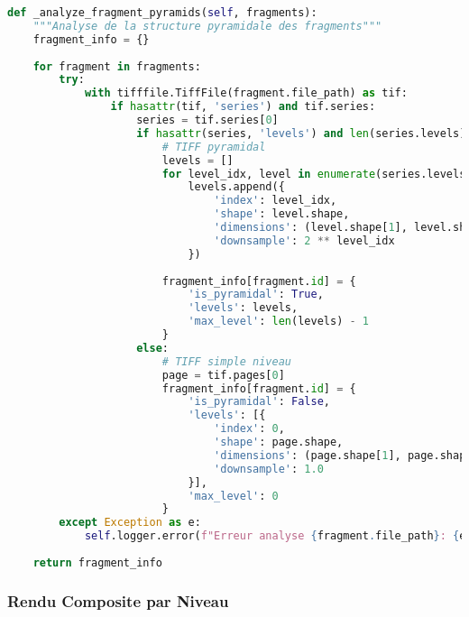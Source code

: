 \documentclass[12pt,a4paper]{article}
\begin{document}
\begin{lstlisting}[language=Python]
def _analyze_fragment_pyramids(self, fragments):
    """Analyse de la structure pyramidale des fragments"""
    fragment_info = {}
    
    for fragment in fragments:
        try:
            with tifffile.TiffFile(fragment.file_path) as tif:
                if hasattr(tif, 'series') and tif.series:
                    series = tif.series[0]
                    if hasattr(series, 'levels') and len(series.levels) > 1:
                        # TIFF pyramidal
                        levels = []
                        for level_idx, level in enumerate(series.levels):
                            levels.append({
                                'index': level_idx,
                                'shape': level.shape,
                                'dimensions': (level.shape[1], level.shape[0]),
                                'downsample': 2 ** level_idx
                            })
                        
                        fragment_info[fragment.id] = {
                            'is_pyramidal': True,
                            'levels': levels,
                            'max_level': len(levels) - 1
                        }
                    else:
                        # TIFF simple niveau
                        page = tif.pages[0]
                        fragment_info[fragment.id] = {
                            'is_pyramidal': False,
                            'levels': [{
                                'index': 0,
                                'shape': page.shape,
                                'dimensions': (page.shape[1], page.shape[0]),
                                'downsample': 1.0
                            }],
                            'max_level': 0
                        }
        except Exception as e:
            self.logger.error(f"Erreur analyse {fragment.file_path}: {e}")
    
    return fragment_info
\end{lstlisting}

\subsubsection{Rendu Composite par Niveau}
\end{document}
